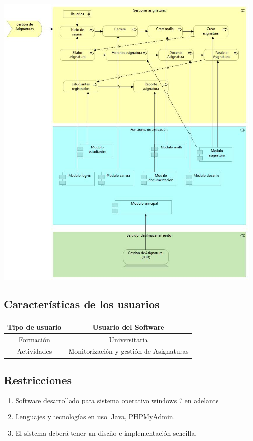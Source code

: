 \documentclass[11pt]{article}
\begin{document}
\includegraphics[scale=0.65]{ModelG.A.jpg}

\subsection{\textbf{Características de los usuarios}}

\vspace{10pt}

\begin{tabular}{|c|c|}

\hline
Tipo de usuario  & Usuario del Software \\
\hline
Formación & Universitaria \\
\hline
Actividades & Monitorización y gestión de Asignaturas  \\
\hline

\end{tabular}

\subsection{\textbf{Restricciones}}

\begin{enumerate}
\item Software desarrollado para sistema operativo windows 7 en 
adelante
\item  Lenguajes y tecnologías en uso: Java, PHPMyAdmin.
\item  El sistema deberá tener un diseño e implementación sencilla.
\end{enumerate}
\end{document}
